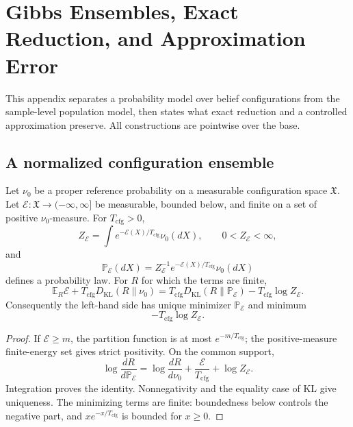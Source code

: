 \section{Gibbs Ensembles, Exact Reduction, and Approximation Error}
\label{sec:meta_agent_rg}\label{app:rigorous_rg}

This appendix separates a probability model over belief configurations from the sample-level population model, then states what exact reduction and a controlled approximation preserve. All constructions are pointwise over the base.

\subsection{A normalized configuration ensemble}
\begin{theorem}\label{thm:belief_configuration_gibbs_lift}
Let $\nu_0$ be a proper reference probability on a measurable configuration space $\mathfrak X$. Let $\mathcal E:\mathfrak X\to(-\infty,\infty]$ be measurable, bounded below, and finite on a set of positive $\nu_0$-measure. For $T_{\mathrm{cfg}}>0$,
\begin{equation}
Z_{\mathcal E}=\int e^{-\mathcal E(X)/T_{\mathrm{cfg}}}\nu_0(dX),
\qquad 0<Z_{\mathcal E}<\infty,
\label{eq:belief_configuration_partition}
\end{equation}
and
\begin{equation}
\mathbb P_{\mathcal E}(dX)
=Z_{\mathcal E}^{-1}e^{-\mathcal E(X)/T_{\mathrm{cfg}}}\nu_0(dX)
\label{eq:belief_configuration_gibbs_density}
\end{equation}
defines a probability law. For $R$ for which the terms are finite,
\begin{equation}
\mathbb E_R\mathcal E+T_{\mathrm{cfg}}D_{\mathrm{KL}}(R\|\nu_0)
=T_{\mathrm{cfg}}D_{\mathrm{KL}}(R\|\mathbb P_{\mathcal E})
-T_{\mathrm{cfg}}\log Z_{\mathcal E}.
\label{eq:belief_configuration_vfe_identity}
\end{equation}
Consequently the left-hand side has unique minimizer $\mathbb P_{\mathcal E}$ and minimum
\begin{equation}
-T_{\mathrm{cfg}}\log Z_{\mathcal E}.
\label{eq:belief_configuration_gibbs_variational_principle}
\end{equation}
\end{theorem}
\begin{proof}
If $\mathcal E\geq m$, the partition function is at most $e^{-m/T_{\mathrm{cfg}}}$; the positive-measure finite-energy set gives strict positivity. On the common support,
\begin{equation}
\log\frac{dR}{d\mathbb P_{\mathcal E}}
=\log\frac{dR}{d\nu_0}+\frac{\mathcal E}{T_{\mathrm{cfg}}}
+\log Z_{\mathcal E}.
\label{eq:gibbs_lift_radon_nikodym_identity}
\end{equation}
Integration proves the identity. Nonnegativity and the equality case of KL give uniqueness. The minimizing terms are finite: boundedness below controls the negative part, and $x e^{-x/T_{\mathrm{cfg}}}$ is bounded for $x\geq0$.
\end{proof}

